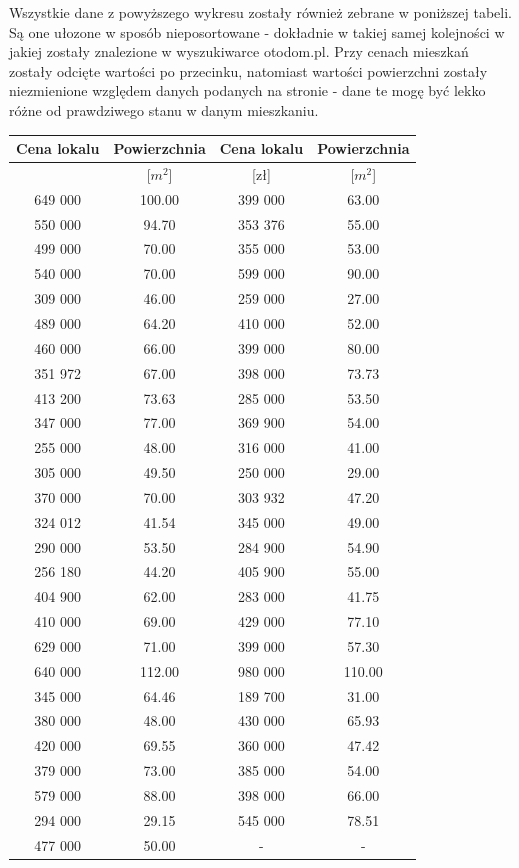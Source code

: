 Wszystkie dane z powyższego wykresu zostały również zebrane w poniższej tabeli. Są one ułozone w sposób nieposortowane - dokładnie w takiej samej kolejności w jakiej zostały znalezione w wyszukiwarce otodom.pl. Przy cenach mieszkań zostały odcięte wartości po przecinku, natomiast wartości powierzchni zostały niezmienione względem danych podanych na stronie - dane te mogę być lekko różne od prawdziwego stanu w danym mieszkaniu.\\

\begin{tabular}{|c|c|c|c|}
	\hline
	Cena lokalu & Powierzchnia & Cena lokalu & Powierzchnia\\
	\hline
	[zł] & [$m^{2}$] & [zł] & [$m^{2}$]\\
	\hline
649 000 & 100.00 & 399 000 & 63.00\\
	\hline
550 000 & 94.70 & 353 376 & 55.00\\
	\hline
499 000 & 70.00 & 355 000 & 53.00\\
	\hline
540 000 & 70.00 & 599 000 & 90.00\\
	\hline
309 000 & 46.00 & 259 000 & 27.00\\
	\hline
489 000 & 64.20 & 410 000 & 52.00\\
	\hline
460 000 & 66.00 & 399 000 & 80.00\\
	\hline
351 972 & 67.00 & 398 000 & 73.73\\
	\hline
413 200 & 73.63 & 285 000 & 53.50\\
	\hline
347 000 & 77.00 & 369 900 & 54.00\\
	\hline
255 000 & 48.00 & 316 000 & 41.00\\
	\hline
305 000 & 49.50 & 250 000 & 29.00\\
	\hline
370 000 & 70.00 & 303 932 & 47.20\\
	\hline
324 012 & 41.54 & 345 000 & 49.00\\
	\hline
290 000 & 53.50 & 284 900 & 54.90\\
	\hline
256 180 & 44.20 & 405 900 & 55.00\\
	\hline
404 900 & 62.00 & 283 000 & 41.75\\
	\hline
410 000 & 69.00 & 429 000 & 77.10\\
	\hline
629 000 & 71.00 & 399 000 & 57.30\\
	\hline
640 000 & 112.00 & 980 000 & 110.00\\
	\hline
345 000 & 64.46 & 189 700 & 31.00\\
	\hline
380 000 & 48.00 & 430 000 & 65.93\\
	\hline
420 000 & 69.55 & 360 000 & 47.42\\
	\hline
379 000 & 73.00 & 385 000 & 54.00\\
	\hline
579 000 & 88.00 & 398 000 & 66.00\\
	\hline
294 000 & 29.15 & 545 000 & 78.51\\
	\hline
477 000 & 50.00 & - & -\\
	\hline
\end{tabular}
